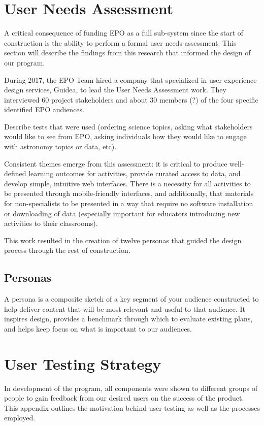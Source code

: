 \section{User Needs Assessment}
A critical consequence of funding EPO as a full sub-system since the start of construction is the ability to perform a formal user needs assessment. This section will describe the findings from this research that informed the design of our program. 

During 2017, the EPO Team hired a company that specialized in user experience design services, Guidea, to lead the User Needs Assessment work.  They interviewed 60 project stakeholders and about 30 members (?) of the four specific identified EPO audiences. 

Describe tests that were used (ordering science topics, asking what stakeholders would like to see from EPO, asking individuals how they would like to engage with astronomy topics or data, etc). 

 Consistent themes emerge from this assessment: it is critical to produce well-defined learning outcomes for activities, provide curated access to data, and develop simple, intuitive web interfaces. There is a necessity for all activities to be presented through mobile-friendly interfaces, and additionally, that materials for non-specialists to be presented in a way that require no software installation or downloading of data (especially important for educators introducing new activities to their classrooms). 

This work resulted in the creation of twelve personas that guided the design process through the rest of construction. 

\subsection{Personas}
A persona is a composite sketch of a key segment of your audience constructed to help deliver content that will be most relevant and useful to that audience. It inspires design, provides a benchmark through which to evaluate existing plans, and helps keep focus on what is important to our audiences.  

\section{User Testing Strategy}
In development of the program, all components were shown to different groups of people to gain feedback from our desired users on the success of the product. This appendix outlines the motivation behind user testing as well as the processes employed. 